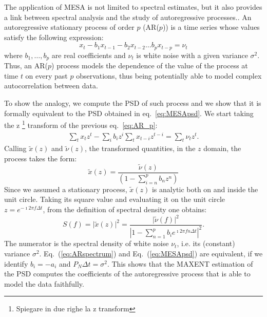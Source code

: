 \documentclass[twocolumn,showpacs,preprintnumbers,nofootinbib,prd,
superscriptaddress,10pt]{revtex4-1}
\begin{document}
The application of MESA is not limited to spectral estimates, but it also provides a link between spectral analysis and the study
of autoregressive processes.\cite{doi:10.1029/RG013i001p00183}.
An autoregressive stationary process of order $p$ (AR($p$)) is a time series whose values satisfy the following expression: 
\begin{equation} \label{eq:AR_p}
    x_t - b_1 x_{t-1} - b_2 x_{t-2} \dots b_p x_{t - p} = \nu_t
\end{equation}
where $b_1, \ldots, b_p$ are real coefficients and $\nu_t$ is white noise with a given variance $\sigma^2$.
Thus, an AR($p$) process models the dependence of the value of the process at time $t$ on every past $p$ observations, 
thus being potentially able to model complex autocorrelation between data.
\par
To show the analogy, we compute the PSD of such process and we show that it is formally equivalent to the PSD obtained in eq.~\ref{eq:MESApsd}.
We start taking the z \footnote{Spiegare in due righe la z transform} transform of the previous eq.~\ref{eq:AR_p}: 
\begin{align}
    \sum_t x_t z^t - \sum_i b_i z^i\sum_t x_{t - i} z^{t - i} = \sum_t \nu_t z^t.
\end{align}
Calling $\tilde x(z)$ and $\tilde \nu (z)$, the transformed quantities, 
in the $z$ domain, the process takes the form:
\begin{equation}
    \tilde x(z) = \frac{\tilde\nu(z)}{\left(1 - \sum_{i = n}^p b_n z^n \right)}
\end{equation}
Since we assumed a stationary process, $\tilde{x}(z)$ is analytic both on and inside the unit circle. Taking its square value and evaluating it on the unit circle $z = e^{-\imath 2 \pi f \Delta t}$, from the definition of spectral density one obtains:
\begin{equation}\label{eq:ARspectrum}
    S(f) = \vert \tilde x(z)\vert ^ 2 = 
    \frac{\vert \tilde \nu(f) \vert ^ 2}{\left\vert 1 - \sum_{n = 1}^p b_i e^{\imath 2 \pi f n \Delta t} \right\vert ^ 2}.
\end{equation}
The numerator is the spectral density of white noise $\nu_t$, i.e. its (constant) variance $\sigma^2$.
Eq.~(\ref{eq:ARspectrum}) and Eq.~(\ref{eq:MESApsd}) are equivalent, if we identify $b_i = - a_i$ and $P_N \Delta t= \sigma ^ 2$.
This shows that the MAXENT estimation of the PSD computes the coefficients of the autoregressive process that is able to model the data faithfully.
\end{document}

